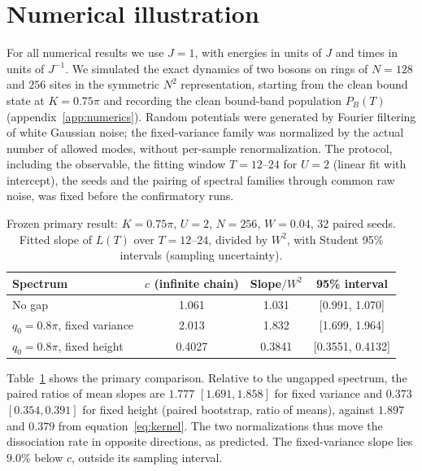 \documentclass[12pt,a4paper]{article}
\theoremstyle{remark}
\begin{document}
\section{Numerical illustration}\label{sec:numerics}

For all numerical results we use $J=1$, with energies in units of $J$ and times in units of $J^{-1}$. We simulated the exact dynamics of two bosons on rings of $N=128$ and $256$ sites in the symmetric $N^2$ representation, starting from the clean bound state at $K=0.75\pi$ and recording the clean bound-band population $P_B(T)$ (appendix~\ref{app:numerics}). Random potentials were generated by Fourier filtering of white Gaussian noise; the fixed-variance family was normalized by the actual number of allowed modes, without per-sample renormalization. The protocol, including the observable, the fitting window $T=12$--$24$ for $U=2$ (linear fit with intercept), the seeds and the pairing of spectral families through common raw noise, was fixed before the confirmatory runs.

\begin{table}[t]
\centering
\caption{Frozen primary result: $K=0.75\pi$, $U=2$, $N=256$, $W=0.04$, 32 paired seeds. Fitted slope of $L(T)$ over $T=12$--$24$, divided by $W^2$, with Student 95\% intervals (sampling uncertainty).}
\label{tab:numerics}
\begin{tabular}{@{}lccc@{}}
\toprule
Spectrum & $c$ (infinite chain) & Slope$/W^2$ & 95\% interval\\
\midrule
No gap & 1.061 & 1.031 & [0.991, 1.070]\\
$q_0=0.8\pi$, fixed variance & 2.013 & 1.832 & [1.699, 1.964]\\
$q_0=0.8\pi$, fixed height & 0.4027 & 0.3841 & [0.3551, 0.4132]\\
\bottomrule
\end{tabular}
\end{table}

Table~\ref{tab:numerics} shows the primary comparison. Relative to the ungapped spectrum, the paired ratios of mean slopes are $1.777$ $[1.691,1.858]$ for fixed variance and $0.373$ $[0.354,0.391]$ for fixed height (paired bootstrap, ratio of means), against $1.897$ and $0.379$ from equation~\eqref{eq:kernel}. The two normalizations thus move the dissociation rate in opposite directions, as predicted. The fixed-variance slope lies $9.0\%$ below $c$, outside its sampling interval.
\end{document}
